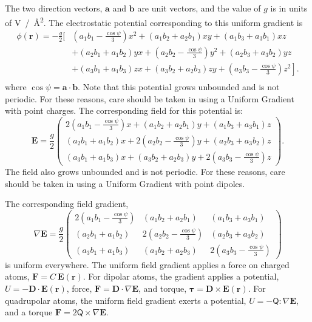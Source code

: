 \documentclass[letterpaper]{report}
\begin{document}
The two direction vectors, $\mathbf{a}$ and $\mathbf{b}$ are unit
vectors, and the value of $g$ is in units of
V~/~\AA\textsuperscript{2}. The electrostatic potential corresponding
to this uniform gradient is
\begin{align}
\phi(\mathbf{r})  = - \frac{g}{2} \Big[&
    \left(a_1 b_1 - \frac{\cos\psi}{3}\right) x^2
    + (a_1 b_2 + a_2 b_1) x y + (a_1 b_3 + a_3 b_1) x z \\
    & + (a_2 b_1 + a_1 b_2) y x 
    + \left(a_2 b_2 - \frac{\cos\psi}{3}\right) y^2
    + (a_2 b_3 + a_3 b_2) y z \\
    & \left. + (a_3 b_1 + a_1 b_3) z x 
    + (a_3 b_2 + a_2 b_3) z y
    + \left(a_3 b_3 - \frac{\cos\psi}{3}\right) z^2 \right]. \\
\end{align}
where $\cos \psi = \mathbf{a} \cdot \mathbf{b}$.  Note that this
potential grows unbounded and is not periodic.  For these reasons,
care should be taken in using a Uniform Gradient with point
charges. The corresponding field for this potential is:
\begin{equation}
\mathbf{E} = \frac{g}{2} \left( \begin{array}{c} 
    2\left(a_1 b_1 - \frac{\cos\psi}{3}\right) x +  (a_1 b_2 + a_2 b_1) y 
    + (a_1 b_3 + a_3 b_1) z  \\
    (a_2 b_1 + a_1 b_2)  x + 2 \left(a_2 b_2 - \frac{\cos\psi}{3}\right) y 
    + (a_2 b_3 + a_3 b_2) z \\
    (a_3 b_1 + a_1 b_3) x +  (a_3 b_2 + a_2 b_3) y 
    + 2 \left(a_3 b_3 - \frac{\cos\psi}{3}\right) z \end{array}
\right).
\end{equation}
The field also grows unbounded and is not periodic.  For these reasons,
care should be taken in using a Uniform Gradient with point dipoles.

The corresponding field gradient,
\begin{equation}
\nabla \mathbf{E} = \frac{g}{2} \left( \begin{array}{ccc}  
    2\left(a_1 b_1 - \frac{\cos\psi}{3}\right)  &  
    (a_1 b_2 + a_2 b_1) & (a_1 b_3 + a_3 b_1) \\
    (a_2 b_1 + a_1 b_2)  & 2 \left(a_2 b_2 - \frac{\cos\psi}{3}\right) & 
    (a_2 b_3 + a_3 b_2) \\
    (a_3 b_1 + a_1 b_3) & (a_3 b_2 + a_2 b_3) & 
    2 \left(a_3 b_3 - \frac{\cos\psi}{3}\right) \end{array} \right)
\end{equation}
is uniform everywhere. The uniform field gradient applies a force on
charged atoms, $\mathbf{F} = C~\mathbf{E}(\mathbf{r})$.  For dipolar
atoms, the gradient applies a potential, $U = -\mathbf{D} \cdot
\mathbf{E}(\mathbf{r})$, force, $\mathbf{F} = \mathbf{D} \cdot
\nabla \mathbf{E}$, and torque, $ \mathbf{\tau} = \mathbf{D} \times
\mathbf{E}(\mathbf{r})$.  For quadrupolar atoms, the uniform field
gradient exerts a potential, $U = - \mathsf{Q}:\nabla \mathbf{E}$, and
a torque $ \mathbf{F} = 2 \mathsf{Q} \times \nabla \mathbf{E}$.
\end{document}
